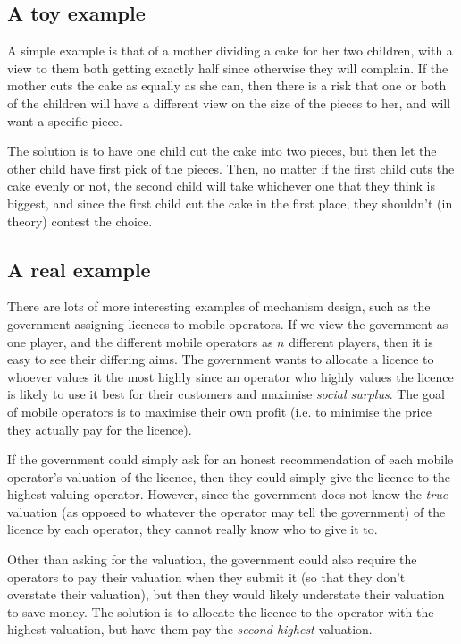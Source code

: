 \subsection{A toy example}

A simple example is that of a mother dividing a cake for her two
children, with a view to them both getting exactly half since
otherwise they will complain. If the mother cuts the cake as equally
as she can, then there is a risk that one or both of the children will
have a different view on the size of the pieces to her, and will want
a specific piece.


The solution is to have one child cut the cake into two pieces, but
then let the other child have first pick of the pieces. Then, no
matter if the first child cuts the cake evenly or not, the second
child will take whichever one that they think is biggest, and since
the first child cut the cake in the first place, they shouldn't (in
theory) contest the choice.

\subsection{A real example}

There are lots of more interesting examples of mechanism design, such
as the government assigning licences to mobile operators. If we view
the government as one player, and the different mobile operators as
$n$ different players, then it is easy to see their differing aims.
The government wants to allocate a licence to whoever values it the
most highly since an operator who highly values the licence is likely
to use it best for their customers and maximise \textit{social
surplus}. The goal of mobile operators is to maximise their own profit
(i.e. to minimise the price they actually pay for the licence).

If the government could simply ask for an honest recommendation of
each mobile operator's valuation of the licence, then they could
simply give the licence to the highest valuing operator. However,
since the government does not know the \textit{true} valuation (as
opposed to whatever the operator may tell the government) of the
licence by each operator, they cannot really know who to give it to.

Other than asking for the valuation, the government could also require
the operators to pay their valuation when they submit it (so that they
don't overstate their valuation), but then they would likely
understate their valuation to save money. The solution is to allocate
the licence to the operator with the highest valuation, but have them
pay the \textit{second highest} valuation.

